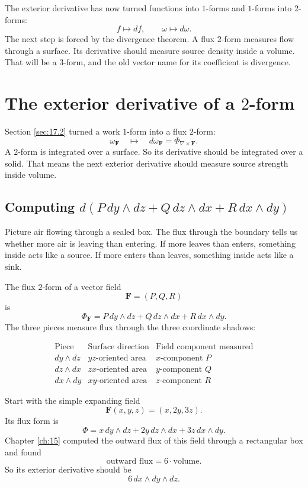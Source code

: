 The exterior derivative has now turned functions into \(1\)-forms and \(1\)-forms into
\(2\)-forms:
\[
    f\longmapsto df,
    \qquad
    \omega\longmapsto d\omega.
\]
The next step is forced by the divergence theorem.  A flux \(2\)-form measures flow
through a surface.  Its derivative should measure source density inside a volume.  That
will be a \(3\)-form, and the old vector name for its coefficient is divergence.
\section{The exterior derivative of a \texorpdfstring{\(2\)}{2}-form}
\label{sec:17.3}

Section \ref{sec:17.2} turned a work \(1\)-form into a flux \(2\)-form:
\[
    \omega_{\mathbf F}
    \quad\longmapsto\quad
    d\omega_{\mathbf F}
    =
    \Phi_{\nabla\times\mathbf F}.
\]
A \(2\)-form is integrated over a surface.  So its derivative should be integrated over
a solid.  That means the next exterior derivative should measure source strength
inside volume.

\subsection{Computing
\texorpdfstring{\(d(P\,dy\wedge dz+Q\,dz\wedge dx+R\,dx\wedge dy)\)}%
{d(P dy dz + Q dz dx + R dx dy)}}

Picture air flowing through a sealed box.  The flux through the boundary tells us
whether more air is leaving than entering.  If more leaves than enters, something
inside acts like a source.  If more enters than leaves, something inside acts like a sink.

The flux \(2\)-form of a vector field
\[
    \mathbf F=(P,Q,R)
\]
is
\[
    \Phi_{\mathbf F}
    =
    P\,dy\wedge dz
    +
    Q\,dz\wedge dx
    +
    R\,dx\wedge dy.
\]
The three pieces measure flux through the three coordinate shadows:

\[
\begin{array}{c|c|c}
\text{Piece} & \text{Surface direction} & \text{Field component measured}\\ \hline
dy\wedge dz & yz\text{-oriented area} & x\text{-component }P\\[1mm]
dz\wedge dx & zx\text{-oriented area} & y\text{-component }Q\\[1mm]
dx\wedge dy & xy\text{-oriented area} & z\text{-component }R
\end{array}
\]

Start with the simple expanding field
\[
    \mathbf F(x,y,z)=(x,2y,3z).
\]
Its flux form is
\[
    \Phi=x\,dy\wedge dz+2y\,dz\wedge dx+3z\,dx\wedge dy.
\]
Chapter \ref{ch:15} computed the outward flux of this field through a rectangular box
and found
\[
    \text{outward flux}=6\cdot\text{volume}.
\]
So its exterior derivative should be
\[
    6\,dx\wedge dy\wedge dz.
\]

